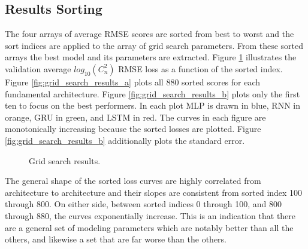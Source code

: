 \subsection{Results Sorting}
The four arrays of average RMSE scores are sorted from best to worst and the sort indices are applied to the array of grid search parameters. From these sorted arrays the best model and its parameters are extracted. Figure \ref{fig:grid_search_results} illustrates the validation average $log_{10}(C_{n}^{2})$ RMSE loss as a function of the sorted index. Figure \ref{fig:grid_search_results_a} plots all 880 sorted scores for each fundamental architecture. Figure \ref{fig:grid_search_results_b} plots only the first ten to focus on the best performers. In each plot MLP is drawn in blue, RNN in orange, GRU in green, and LSTM in red. The curves in each figure are monotonically increasing because the sorted losses are plotted. Figure \ref{fig:grid_search_results_b} additionally plots the standard error.
\begin{figure}[h!]
	\centering
	\hfill
	\caption{Grid search results.}
	\label{fig:grid_search_results}
\end{figure}
The general shape of the sorted loss curves are highly correlated from architecture to architecture and their slopes are consistent from sorted index 100 through 800. On either side, between sorted indices 0 through 100, and 800 through 880, the curves exponentially increase. This is an indication that there are a general set of modeling parameters which are notably better than all the others, and likewise a set that are far worse than the others.

